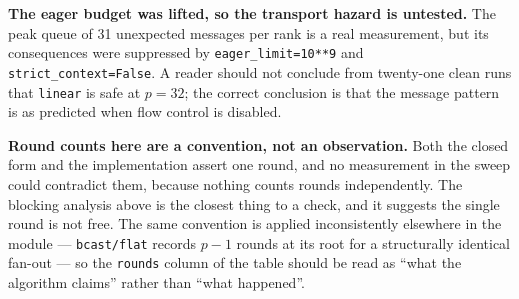 \documentclass[11pt]{article}
\begin{document}
\textbf{The eager budget was lifted, so the transport hazard is untested.} The peak queue of
31 unexpected messages per rank is a real measurement, but its consequences were suppressed by
\texttt{eager\_limit=10**9} and \texttt{strict\_context=False}. A reader should not conclude
from twenty-one clean runs that \texttt{linear} is safe at $p=32$; the correct conclusion is
that the message pattern is as predicted when flow control is disabled.

\textbf{Round counts here are a convention, not an observation.} Both the closed form and the
implementation assert one round, and no measurement in the sweep could contradict them,
because nothing counts rounds independently. The blocking analysis above is the closest thing
to a check, and it suggests the single round is not free. The same convention is applied
inconsistently elsewhere in the module --- \texttt{bcast/flat} records $p-1$ rounds at its
root for a structurally identical fan-out --- so the \texttt{rounds} column of the table
should be read as ``what the algorithm claims'' rather than ``what happened''.
\end{document}
